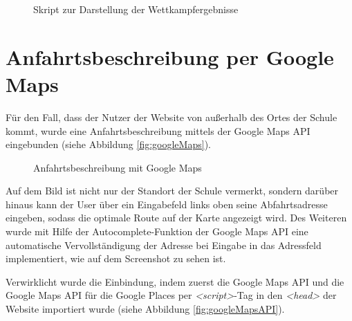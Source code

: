 \begin{figure}[!h]
	\caption{Skript zur Darstellung der Wettkampfergebnisse}
	\label{fig:javaScript}
\end{figure}

\section{Anfahrtsbeschreibung per Google Maps}
\label{Anfahrtsbeschreibung per Google Maps}
Für den Fall, dass der Nutzer der Website von außerhalb des Ortes der Schule kommt, wurde eine Anfahrtsbeschreibung mittels der Google Maps API eingebunden (siehe Abbildung \vref{fig:googleMaps}).

\begin{figure}[!hp]
	\caption{Anfahrtsbeschreibung mit Google Maps}
	\label{fig:googleMaps}
\end{figure}

Auf dem Bild ist nicht nur der Standort der Schule vermerkt, sondern darüber hinaus kann der User über ein Eingabefeld links oben seine Abfahrtsadresse eingeben, sodass die optimale Route auf der Karte angezeigt wird. Des Weiteren wurde mit Hilfe der Autocomplete-Funktion der Google Maps API eine automatische Vervollständigung der Adresse bei Eingabe in das Adressfeld implementiert, wie auf dem Screenshot zu sehen ist.
\par
Verwirklicht wurde die Einbindung, indem zuerst die Google Maps API und die Google Maps API für die Google Places per \textit{<script>}-Tag in den \textit{<head>} der Website importiert wurde (siehe Abbildung \vref{fig:googleMapsAPI}).

